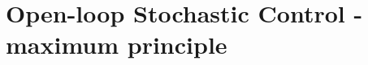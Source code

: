 \documentclass{beamer}
\begin{document}
% 
% 
% 
% 
% 
% 


\section{Open-loop Stochastic Control - maximum principle}
\end{document}
